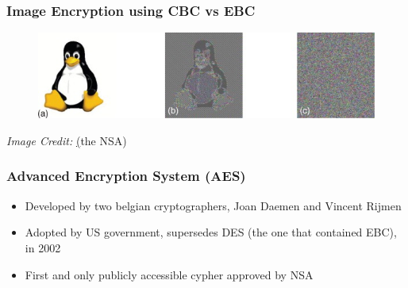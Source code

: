 \documentclass{beamer}
\begin{document}
\begin{frame}
    \frametitle{Image Encryption using CBC vs EBC}
    \begin{figure}
        \begin{center}
            \includegraphics[scale=0.6]{image_cbc.jpg}
        \end{center}
    \end{figure}
    \textit{Image Credit: }\href{https://www.sciencedirect.com/topics/computer-science/electronic-code-book}(the NSA)
\end{frame}

\begin{frame}
    \frametitle{Advanced Encryption System (AES)}
    \begin{itemize}
        \item \pause Developed by two belgian cryptographers,  Joan Daemen and Vincent Rijmen \pause
        \item Adopted by US government, supersedes DES (the one that contained EBC), in 2002 \pause
        \item First and only publicly accessible cypher approved by NSA 
    \end{itemize}
    
\end{frame}
\end{document}
